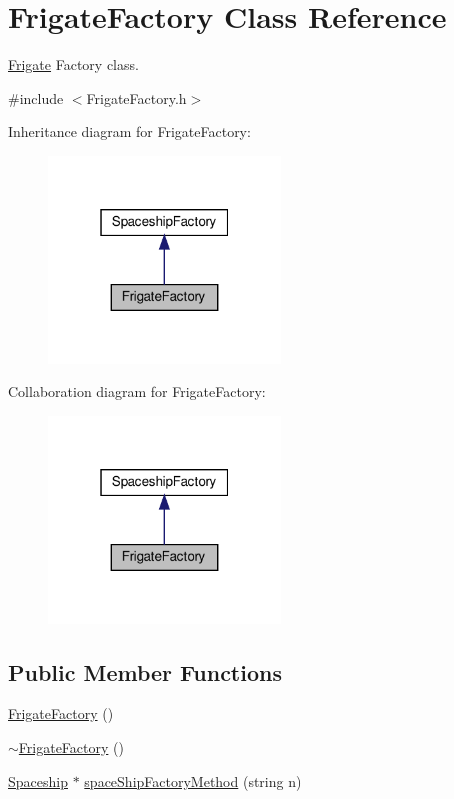 \hypertarget{classFrigateFactory}{}\section{Frigate\+Factory Class Reference}
\label{classFrigateFactory}


\hyperlink{classFrigate}{Frigate} Factory class.  




{\ttfamily \#include $<$Frigate\+Factory.\+h$>$}



Inheritance diagram for Frigate\+Factory\+:\nopagebreak
\begin{figure}[H]
\begin{center}
\leavevmode
\includegraphics[width=175pt]{classFrigateFactory__inherit__graph}
\end{center}
\end{figure}


Collaboration diagram for Frigate\+Factory\+:\nopagebreak
\begin{figure}[H]
\begin{center}
\leavevmode
\includegraphics[width=175pt]{classFrigateFactory__coll__graph}
\end{center}
\end{figure}
\subsection*{Public Member Functions}
\begin{DoxyCompactItemize}
\item 
\hyperlink{classFrigateFactory_a1025a996e1e48f03bacac243ec1540b8}{Frigate\+Factory} ()
\item 
\hyperlink{classFrigateFactory_ae1433ffe26d615f35bf62d00c026c6a9}{$\sim$\+Frigate\+Factory} ()
\item 
\hyperlink{classSpaceship}{Spaceship} $\ast$ \hyperlink{classFrigateFactory_a52216b3322eb2ebd3b695d3275db28e1}{space\+Ship\+Factory\+Method} (string n)
\end{DoxyCompactItemize}


